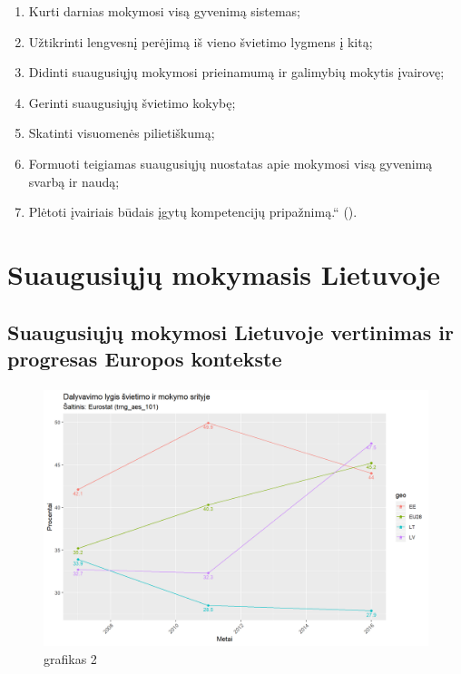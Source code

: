 \documentclass[12pt,a4paper, titlepage]{article}
\begin{document}
\begin{enumerate}

\item Kurti darnias mokymosi visą gyvenimą sistemas;
\item Užtikrinti lengvesnį perėjimą iš vieno švietimo lygmens į kitą;
\item Didinti suaugusiųjų mokymosi prieinamumą ir galimybių mokytis įvairovę;
\item Gerinti suaugusiųjų švietimo kokybę;
\item Skatinti visuomenės pilietiškumą;
\item Formuoti teigiamas suaugusiųjų nuostatas apie mokymosi visą gyvenimą svarbą ir naudą;
\item Plėtoti įvairiais būdais įgytų kompetencijų pripažnimą.“ (\cite{Zablacke2015}).

\end{enumerate}

\section{Suaugusiųjų mokymasis Lietuvoje}

\subsection{Suaugusiųjų mokymosi Lietuvoje vertinimas ir progresas Europos kontekste}
\paragraph{}

\begin{figure}[H]
\center
\includegraphics[scale=0.75]{Dalyvavimo_lygis_svietimo_ir_mokymo_srityje}
\caption{grafikas 2}
\end{figure}
\end{document}
